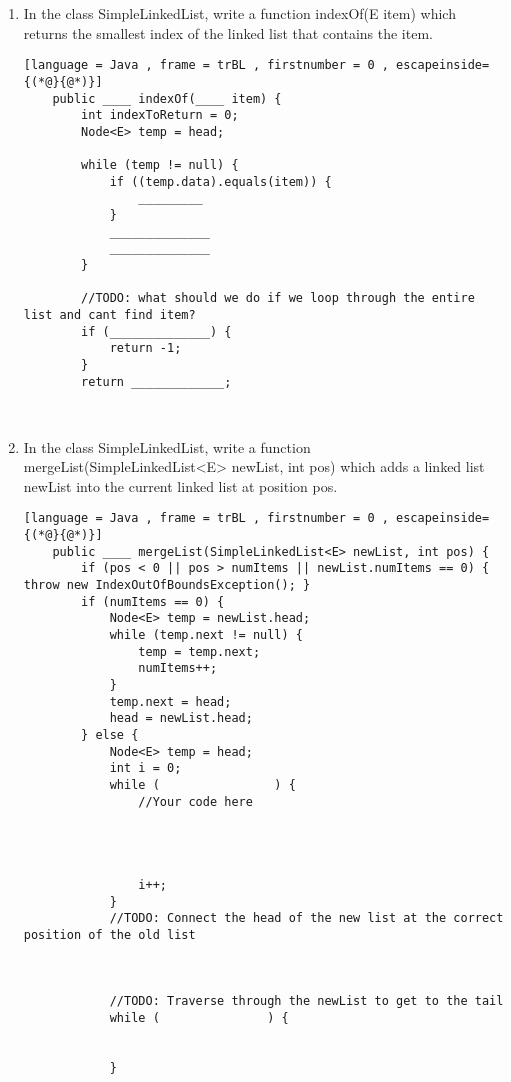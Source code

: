 \documentclass[letter]{article}
\begin{document}
\begin{enumerate}[1.]
    \newpage

    \item In the class SimpleLinkedList, write a function indexOf(E item) which returns the smallest index of the linked list that contains the item.

    \begin{lstlisting}[language = Java , frame = trBL , firstnumber = 0 , escapeinside={(*@}{@*)}]
    public ____ indexOf(____ item) {
        int indexToReturn = 0;
        Node<E> temp = head;
        
        while (temp != null) {
            if ((temp.data).equals(item)) {
                _________
            }
            ______________
            ______________
        }

        //TODO: what should we do if we loop through the entire list and cant find item?
        if (______________) {
            return -1;
        }
        return _____________;
    
    
    \end{lstlisting}
    
    \item In the class SimpleLinkedList, write a function mergeList(SimpleLinkedList<E> newList, int pos) which adds a linked list newList into the current linked list at position pos. 

    \begin{lstlisting}[language = Java , frame = trBL , firstnumber = 0 , escapeinside={(*@}{@*)}]
    public ____ mergeList(SimpleLinkedList<E> newList, int pos) {
        if (pos < 0 || pos > numItems || newList.numItems == 0) { throw new IndexOutOfBoundsException(); }
        if (numItems == 0) {
            Node<E> temp = newList.head;
            while (temp.next != null) {
                temp = temp.next;
                numItems++;
            }
            temp.next = head;
            head = newList.head;
        } else {
            Node<E> temp = head;
            int i = 0;
            while (                ) {
                //Your code here



                
                i++;
            }
            //TODO: Connect the head of the new list at the correct position of the old list

            

            //TODO: Traverse through the newList to get to the tail
            while (               ) {

                
            }


\end{lstlisting}
\end{enumerate}
\end{document}
